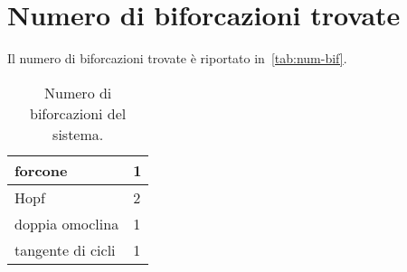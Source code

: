 \newpage
\section{Numero di biforcazioni trovate}
Il numero di biforcazioni trovate è riportato in~\autoref{tab:num-bif}.
\begin{table}[h]
    \centering
\begin{tabular}{| l | l |}
\hline
forcone & 1 \\
\hline
Hopf & 2 \\
\hline
doppia omoclina & 1 \\
\hline
tangente di cicli & 1 \\
\hline
\end{tabular}
\caption{Numero di biforcazioni del sistema.}
\label{tab:num-bif}
\end{table}
